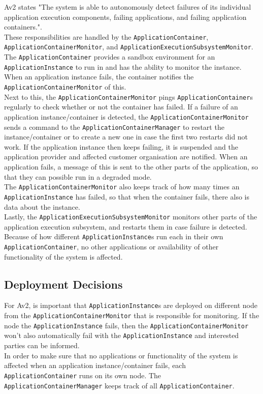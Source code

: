         Av2 states "The system is able to autonomously detect failures of its individual
        application execution components, failing applications, and failing application containers.".\\
        These responsibilities are handled by the \texttt{ApplicationContainer}, \texttt{ApplicationContainerMonitor}, and \texttt{ApplicationExecutionSubsystemMonitor}.
        The \texttt{ApplicationContainer} provides a sandbox environment for an \texttt{ApplicationInstance} to run in and has the ability
        to monitor the instance. When an application instance fails, the container notifies the \texttt{ApplicationContainerMonitor} of this.\\
        Next to this, the \texttt{ApplicationContainerMonitor} pings \texttt{ApplicationContainer}s regularly to check whether or not the container
        has failed. If a failure of an application instance/container is detected, the \texttt{ApplicationContainerMonitor} sends a command to the
        \texttt{ApplicationContainerManager} to restart the instance/container or to create a new one in case the first two restarts did not work.
        If the application instance then keeps failing, it is suspended and the application provider and affected customer organisation are notified.
        When an application fails, a message of this is sent to the other parts of the application, so that they can possible run in a degraded mode. \\
        The \texttt{ApplicationContainerMonitor} also keeps track of how many times an \texttt{ApplicationInstance} has failed, so that when the container
        fails, there also is data about the instance.\\
        Lastly, the \texttt{ApplicationExecutionSubsystemMonitor} monitors other parts of the application execution subsystem, and restarts them
        in case failure is detected. \\

        Because of how different \texttt{ApplicationInstance}s run each in their own \texttt{ApplicationContainer}, no other applications or availability
        of other functionality of the system is affected.

    \subsection*{Deployment Decisions}
        For Av2, is important that \texttt{ApplicationInstance}s are deployed on different node from the \texttt{ApplicationContainerMonitor} that is responsible for
        monitoring. If the node the \texttt{ApplicationInstance} fails, then the \texttt{ApplicationContainerMonitor} won't also automatically fail with the \texttt{ApplicationInstance}
        and interested parties can be informed. \\
        In order to make sure that no applications or functionality of the system is affected when an application instance/container fails, each \texttt{ApplicationContainer}
        runs on its own node. The \texttt{ApplicationContainerManager} keeps track of all \texttt{ApplicationContainer}.
